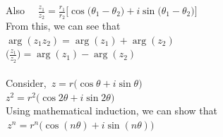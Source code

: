 \documentclass[11pt,a4paper]{article}
\theoremstyle{definition}
\begin{document}
Also $\quad  \frac{z_1}{z_2} = \frac{r_1}{r_2}\big[\cos\big(\theta_1 - \theta_2\big) + i \sin \big(\theta_1 - \theta_2\big)\big]$\\

From this, we can see that \\

$\operatorname{arg}(z_1z_2) = \operatorname{arg}(z_1) + \operatorname{arg}(z_2)$\\

$\Big(\frac{z_1}{z_2}\Big) = \operatorname{arg}(z_1) - \operatorname{arg}(z_2)$\\\\



Consider, $\, z = r\big(\cos \theta + i \sin \theta\big)\,$\\

$ z^2 = r^2\big(\cos 2\theta + i \sin 2\theta\big)\,$\\

Using mathematical induction, we can show that $\, z^n = r^n \big( \cos (n\theta) + i \sin (n\theta)\big)$\\
\end{document}
